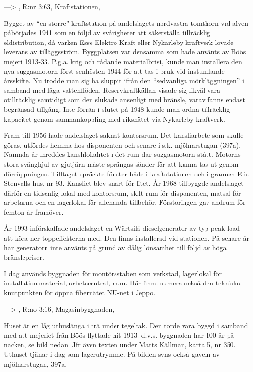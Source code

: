 ---> , R:nr 3:63,	Kraftstationen, 

Bygget av ``en större'' kraftstation på andelslagets nordvästra tomthörn vid älven påbörjades 1941 som en följd av svårigheter att 	säkerställa tillräcklig eldistribution, då varken Esse Elektro Kraft eller Nykarleby kraftverk lovade leverans av tilläggsström. Byggplatsen var densamma som hade använts av Böös mejeri 1913-33. P.g.a. krig och rådande materialbrist, kunde man installera den nya suggasmotorn först senhösten 1944 för att tas i bruk vid instundande årsskifte. Nu trodde man sig ha sluppit ifrån den ``sedvanliga mörkläggningen'' i samband med låga vattenflöden. Reservkraftkällan visade sig likväl vara otillräcklig samtidigt som den slukade ansenligt med bränsle, varav fanns endast begränsad tillgång. Inte förrän i slutet på 1948 kunde man ordna tillräcklig kapacitet genom sammankoppling med riksnätet via Nykarleby kraftverk.


Fram till 1956 hade andelslaget saknat kontorsrum. Det kansliarbete som skulle göras, utfördes hemma hos disponenten och senare i s.k. mjölnarstugan (397a). Nämnda år inreddes kanslilokalitet i det rum där suggasmotorn stått. Motorns stora svänghjul av gjutjärn måste sprängas sönder för att kunna tas ut genom dörröppningen. Tilltaget spräckte fönster både i kraftstationen och i grannen Elis Stenvalls hus, nr 93. Kansliet blev snart för litet. År 1968 tillbyggde andelslaget därför en tidsenlig lokal med kontorsrum, skilt rum för disponenten, matsal för arbetarna och en lagerlokal för allehanda tillbehör. Förstoringen gav andrum för femton år framöver.

År 1993 införskaffade andelslaget en Wärtsilä-dieselgenerator av typ peak load att köra ner toppeffekterna med. Den finns installerad vid 	stationen. På senare år har generatorn inte använts på grund av dålig lönsamhet till följd av höga bränslepriser.

I dag används byggnaden för montörsstaben som verkstad, lagerlokal för installationsmaterial, arbetscentral, m.m. Här finns numera också den tekniska knutpunkten för öppna fibernätet NU-net i Jeppo.


---> , R:no 3:16, 	Magasinbyggnaden, 

Huset är en låg uthuslänga i trä under tegeltak. Den torde vara byggd i samband med att mejeriet från Böös flyttade hit 1913, d.v.s. byggnaden har 100 år på nacken, se bild nedan. Jfr även texten under Matts Källman, karta 5, nr 350. Uthuset tjänar i dag som lagerutrymme. På bilden syns också gaveln av mjölnarstugan, 397a.

